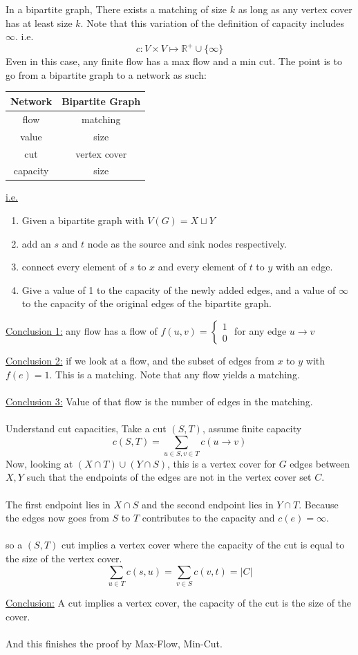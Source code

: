 \documentclass[12pt]{article}
\begin{document}
\begin{tcolorbox}[title=Theorem: (Konig)]
	In a bipartite graph, There exists a matching of size $k$ as long as any vertex cover has at least size $k$.
	\tcblower
	Note that this variation of the definition of capacity includes $\infty$. i.e.
	$$c: V \times V \mapsto \mathbb{R}^+ \cup \{ \infty \}$$
	Even in this case, any finite flow has a max flow and a min cut. The point is to go from a bipartite graph to a network as such:
	\begin{center}
 \begin{tabular}{||c c||} 
 \hline
 Network & Bipartite Graph \\ [0.5ex] 
 \hline\hline
 flow & matching \\ 
 \hline
 value & size  \\
 \hline
 cut & vertex cover   \\
 \hline
 capacity & size \\ [1ex] 
 \hline
\end{tabular}
\end{center}
\end{tcolorbox}
\underline{i.e.}
\begin{enumerate}
	\item{Given a bipartite graph with $V(G) = X \sqcup Y$}
	\item{add an $s$ and $t$ node as the source and sink nodes respectively.}
	\item{connect every element of $s$ to $x$ and every element of $t$ to $y$ with an edge.}
	\item{Give a value of 1 to the capacity of the newly added edges, and a value of $\infty$ to the capacity of the original edges of the bipartite graph. }
\end{enumerate}

\underline{Conclusion 1:} any flow has a flow of $f(u,v)=\begin{cases}
1\\
0
\end{cases}$ for any edge $u\rightarrow v$

\underline{Conclusion 2:} if we look at a flow, and the subset of edges from $x$ to $y$ with $f(e)=1$. This is a matching. Note that any flow yields a matching.\\
\\
\underline{Conclusion 3:} Value of that flow is the number of edges in the matching.\\
\\
Understand cut capacities, Take a cut $(S,T)$, assume finite capacity $$c(S,T) = \sum_{u\in S, v\in T} c(u\rightarrow v)$$
Now, looking at $(X\cap T)\cup(Y\cap S)$, this is a vertex cover for $G$ edges between $X,Y$ such that the endpoints of the edges are not in the vertex cover set $C$.\\
\\
The first endpoint lies in $X \cap S$ and the second endpoint lies in $Y \cap T$. Because the edges now goes from $S$ to $T$ contributes to the capacity and $c(e)=\infty$.\\
\\
so a $(S,T)$ cut implies a vertex cover where the capacity of the cut is equal to the size of the vertex cover.
$$\sum_{u\in T} c(s,u) = \sum_{v\in S} c(v,t) = |C|$$

\underline{Conclusion:} A cut implies a vertex cover, the capacity of the cut is the size of the cover.\\
\\
And this finishes the proof by Max-Flow, Min-Cut.

\newpage
\end{document}
